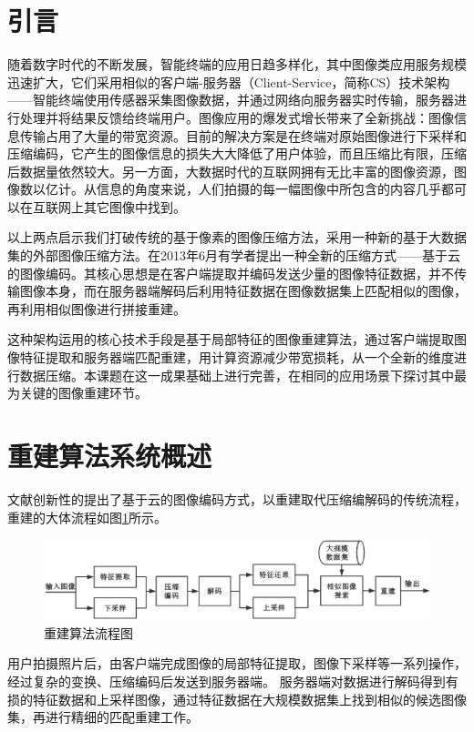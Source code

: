 \documentclass[UTF8]{csoarticle}
\begin{document}
\maketitle


\section{引言}

随着数字时代的不断发展，智能终端的应用日趋多样化，其中图像类应用服务规模迅速扩大，它们采用相似的客户端-服务器（Client-Service，简称CS）技术架构——智能终端使用传感器采集图像数据，并通过网络向服务器实时传输，服务器进行处理并将结果反馈给终端用户。图像应用的爆发式增长带来了全新挑战：图像信息传输占用了大量的带宽资源。目前的解决方案是在终端对原始图像进行下采样和压缩编码，它产生的图像信息的损失大大降低了用户体验，而且压缩比有限，压缩后数据量依然较大。另一方面，大数据时代的互联网拥有无比丰富的图像资源，图像数以亿计。从信息的角度来说，人们拍摄的每一幅图像中所包含的内容几乎都可以在互联网上其它图像中找到。

以上两点启示我们打破传统的基于像素的图像压缩方法，采用一种新的基于大数据集的外部图像压缩方法。在2013年6月有学者提出一种全新的压缩方式——基于云的图像编码。其核心思想是在客户端提取并编码发送少量的图像特征数据，并不传输图像本身，而在服务器端解码后利用特征数据在图像数据集上匹配相似的图像，再利用相似图像进行拼接重建。

这种架构运用的核心技术手段是基于局部特征的图像重建算法，通过客户端提取图像特征提取和服务器端匹配重建，用计算资源减少带宽损耗，从一个全新的维度进行数据压缩。本课题在这一成果基础上进行完善，在相同的应用场景下探讨其中最为关键的图像重建环节。

\section{重建算法系统概述}

文献\cite{Cloud}创新性的提出了基于云的图像编码方式，以重建取代压缩编解码的传统流程，重建的大体流程如图\ref{fig:flow1}所示。
\begin{figure}
\centering\includegraphics[width=15cm]{flowchart1}
\caption{重建算法流程图}
\label{fig:flow1}
\end{figure}
用户拍摄照片后，由客户端完成图像的局部特征提取，图像下采样等一系列操作，经过复杂的变换、压缩编码后发送到服务器端。
服务器端对数据进行解码得到有损的特征数据和上采样图像，通过特征数据在大规模数据集上找到相似的候选图像集，再进行精细的匹配重建工作。
\end{document}
